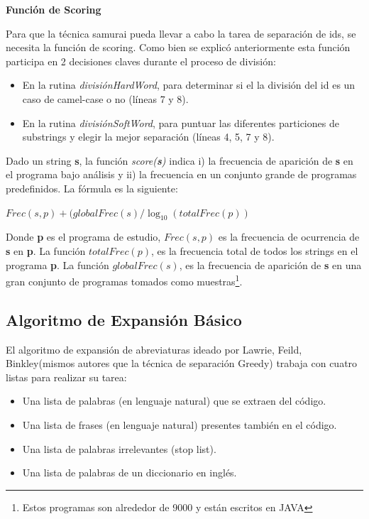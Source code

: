 \documentclass[a4paper,12pt]{report}
\begin{document}
\pagebreak
\noindent \textbf{Función de Scoring}

Para que la técnica samurai pueda llevar a cabo la tarea de separación de ids, se necesita la función de scoring. Como bien se explicó anteriormente esta función participa en 2 decisiones claves durante el proceso de división:

\begin{itemize}
\itemsep0em%
\item En la rutina \textit{divisiónHardWord}, para determinar si el la división del id es un caso de camel-case o no (líneas 7 y 8).

\item En la rutina \textit{divisiónSoftWord}, para puntuar las diferentes particiones de substrings y elegir la mejor separación (líneas 4, 5, 7 y 8).
\end{itemize}

Dado un string \textbf{s}, la función \textit{score(\textbf{s})} indica i) la frecuencia de aparición de \textbf{s} en el programa bajo análisis y ii) la frecuencia en un conjunto grande de programas predefinidos. La fórmula es la siguiente:

\begin{center}
$Frec(s,p) + ( globalFrec(s) / \log_{10}(totalFrec(p) )$
\end{center}

Donde \textbf{p} es el programa de estudio, $Frec(s,p)$ es la frecuencia de ocurrencia de \textbf{s} en \textbf{p}. La función $totalFrec(p)$, es la frecuencia total de todos los strings en el programa \textbf{p}. La función $globalFrec(s)$, es la frecuencia de aparición de \textbf{s} en una gran conjunto de programas tomados como muestras\footnote[1]{Estos programas son alrededor de 9000 y están escritos en JAVA}\cite{EHPV09}.

\pagebreak
\subsection{Algoritmo de Expansión Básico}

El algoritmo de expansión de abreviaturas ideado por Lawrie, Feild, Binkley(mismos autores que la técnica de separación Greedy)\cite{LFBEX07} trabaja con cuatro listas para realizar su tarea:

\begin{itemize}
\itemsep0em%
\item Una lista de palabras (en lenguaje natural) que se extraen del código.
\item Una lista de frases (en lenguaje natural) presentes también en el código.
\item Una lista de palabras irrelevantes (stop list).
\item Una lista de palabras de un diccionario en inglés.
\end{itemize}
\end{document}
